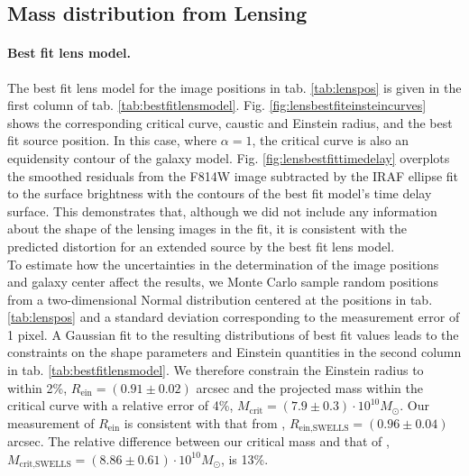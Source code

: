 \subsection{Mass distribution from Lensing}

\paragraph{Best fit lens model.} The best fit lens model for the image positions in tab. \ref{tab:lenspos} is given in the first column of tab. \ref{tab:bestfitlensmodel}. Fig. \ref{fig:lensbestfiteinsteincurves} shows the corresponding critical curve, caustic and Einstein radius, and the best fit source position. In this case, where $\alpha=1$, the critical curve is also an equidensity contour of the galaxy model. Fig. \ref{fig:lensbestfittimedelay} overplots the smoothed residuals from the F814W image subtracted by the IRAF ellipse fit to the surface brightness with the contours of the best fit model's time delay surface. This demonstrates that, although we did not include any information about the shape of the lensing images in the fit, it is consistent with the predicted distortion for an extended source by the best fit lens model.
\\To estimate how the uncertainties in the determination of the image positions and galaxy center affect the results, we Monte Carlo sample random positions from a two-dimensional Normal distribution centered at the positions in tab. \ref{tab:lenspos} and a standard deviation corresponding to the measurement error of 1 pixel. A Gaussian fit to the resulting distributions of best fit values leads to the constraints on the shape parameters and Einstein quantities in the second column in tab. \ref{tab:bestfitlensmodel}. We therefore constrain the Einstein radius to within 2\%, $R_\text{ein} = (0.91 \pm 0.02)$ arcsec and the projected mass within the critical curve with a relative error of 4\%, $M_\text{crit} =(7.9\pm0.3)\cdot 10^{10} M_\odot$. Our measurement of $R_\text{ein}$ is consistent with that from \citet{SWELLSIII}, $R_\text{ein,SWELLS} = (0.96 \pm 0.04)$ arcsec. The relative difference between our critical mass and that of \citet{SWELLSIII}, $M_\text{crit,SWELLS} =(8.86\pm0.61)\cdot 10^{10} M_\odot$, is 13\%.


